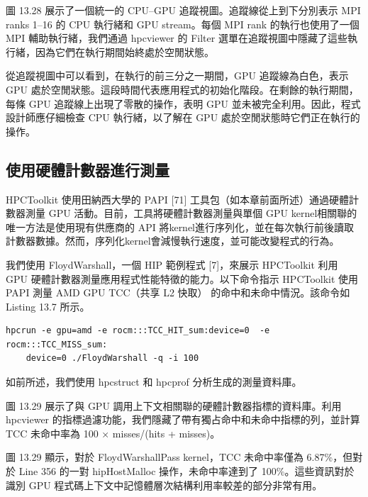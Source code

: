 圖 13.28 展示了一個統一的 CPU–GPU 追蹤視圖。追蹤線從上到下分別表示 MPI ranks 1–16 的 CPU 執行緒和 GPU stream。每個 MPI rank 的執行也使用了一個 MPI 輔助執行緒，我們通過 hpcviewer 的 Filter 選單在追蹤視圖中隱藏了這些執行緒，因為它們在執行期間始終處於空閒狀態。

從追蹤視圖中可以看到，在執行的前三分之一期間，GPU 追蹤線為白色，表示 GPU 處於空閒狀態。這段時間代表應用程式的初始化階段。在剩餘的執行期間，每條 GPU 追蹤線上出現了零散的操作，表明 GPU 並未被完全利用。因此，程式設計師應仔細檢查 CPU 執行緒，以了解在 GPU 處於空閒狀態時它們正在執行的操作。



\subsection{使用硬體計數器進行測量}

HPCToolkit 使用田納西大學的 PAPI [71] 工具包（如本章前面所述）通過硬體計數器測量 GPU 活動。目前，工具將硬體計數器測量與單個 GPU kernel相關聯的唯一方法是使用現有供應商的 API 將kernel進行序列化，並在每次執行前後讀取計數器數據。然而，序列化kernel會減慢執行速度，並可能改變程式的行為。

我們使用 FloydWarshall，一個 HIP 範例程式 [7]，來展示 HPCToolkit 利用 GPU 硬體計數器測量應用程式性能特徵的能力。以下命令指示 HPCToolkit 使用 PAPI 測量 AMD GPU TCC（共享 L2 快取） 的命中和未命中情況。該命令如 Listing 13.7 所示。

\begin{lstlisting}[caption={Listing 13.7: Command for collecting the TCC miss counter for the FloydWarshall application using HPCToolkit.}]
hpcrun -e gpu=amd -e rocm:::TCC_HIT_sum:device=0  -e rocm:::TCC_MISS_sum:
    device=0 .∕FloydWarshall -q -i 100
\end{lstlisting}

如前所述，我們使用 hpcstruct 和 hpcprof 分析生成的測量資料庫。

圖 13.29 展示了與 GPU 調用上下文相關聯的硬體計數器指標的資料庫。利用 hpcviewer 的指標過濾功能，我們隱藏了帶有獨占命中和未命中指標的列，並計算 TCC 未命中率為 100 × misses/(hits + misses)。

圖 13.29 顯示，對於 FloydWarshallPass kernel，TCC 未命中率僅為 6.87\%，但對於 Line 356 的一對 hipHostMalloc 操作，未命中率達到了 100\%。這些資訊對於識別 GPU 程式碼上下文中記憶體層次結構利用率較差的部分非常有用。

